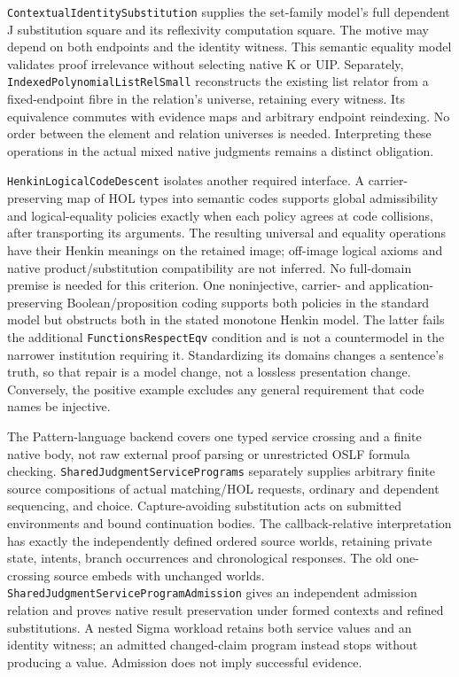 \documentclass[11pt]{article}
\theoremstyle{definition}
\theoremstyle{remark}
\begin{document}
\texttt{ContextualIdentitySubstitution} supplies the set-family model's
full dependent J substitution square and its reflexivity computation square.
The motive may depend on both endpoints and the identity witness. This
semantic equality model validates proof irrelevance without selecting native
K or UIP. Separately, \texttt{IndexedPolynomialListRelSmall} reconstructs the
existing list relator from a fixed-endpoint fibre in the relation's universe,
retaining every witness. Its equivalence commutes with evidence maps and
arbitrary endpoint reindexing. No order between the element and relation
universes is needed. Interpreting these operations in the actual mixed native
judgments remains a distinct obligation.

\texttt{HenkinLogicalCodeDescent} isolates another required interface.
A carrier-preserving map of HOL types into semantic codes supports global
admissibility and logical-equality policies exactly when each policy agrees
at code collisions, after transporting its arguments. The resulting universal
and equality operations have their Henkin meanings on the retained image;
off-image logical axioms and native product/substitution compatibility are
not inferred. No full-domain premise is needed for this criterion.
One noninjective, carrier- and application-preserving Boolean/proposition
coding supports both policies in the standard model but obstructs both in
the stated monotone Henkin model. The latter fails the additional
\texttt{FunctionsRespectEqv} condition and is not a countermodel in the
narrower institution requiring it. Standardizing its domains changes a
sentence's truth, so that repair is a model change, not a lossless presentation
change. Conversely, the positive example excludes any general requirement
that code names be injective.

The Pattern-language backend covers one typed service crossing and a finite native
body, not raw external proof parsing or unrestricted OSLF formula checking.
\texttt{SharedJudgmentServicePrograms} separately supplies arbitrary finite
source compositions of actual matching/HOL requests, ordinary and dependent
sequencing, and choice. Capture-avoiding substitution acts on submitted
environments and bound continuation bodies. The callback-relative
interpretation has exactly the independently defined ordered source worlds,
retaining private state, intents, branch occurrences and chronological
responses. The old one-crossing source embeds with unchanged worlds.
\texttt{SharedJudgmentServiceProgramAdmission} gives an independent admission
relation and proves native result preservation under formed contexts and
refined substitutions. A nested Sigma workload retains both service values
and an identity witness; an admitted changed-claim program instead stops
without producing a value. Admission does not imply successful evidence.
\end{document}
